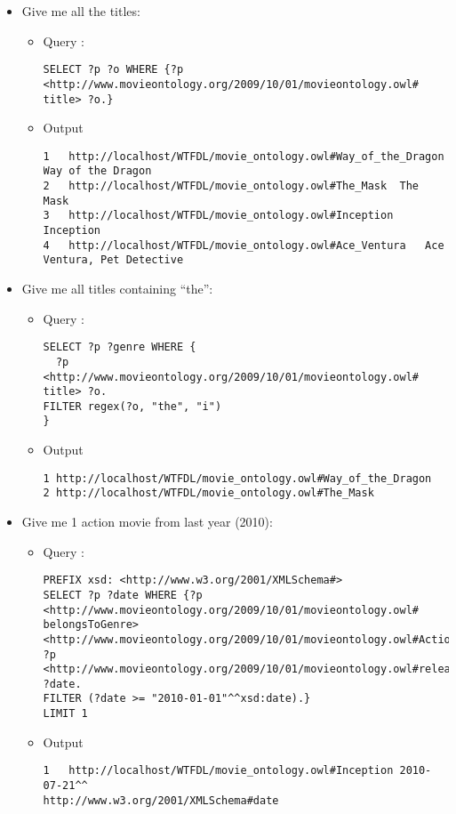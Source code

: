 \begin{itemize}

 \item Give me all the titles:
  \begin{itemize}
    \item Query : 
\begin{verbatim}
SELECT ?p ?o WHERE {?p <http://www.movieontology.org/2009/10/01/movieontology.owl#
title> ?o.}
\end{verbatim}
    \item Output
      \begin{verbatim}
1	http://localhost/WTFDL/movie_ontology.owl#Way_of_the_Dragon	Way of the Dragon	
2	http://localhost/WTFDL/movie_ontology.owl#The_Mask	The Mask	
3	http://localhost/WTFDL/movie_ontology.owl#Inception	Inception	
4	http://localhost/WTFDL/movie_ontology.owl#Ace_Ventura	Ace Ventura, Pet Detective	
      \end{verbatim}
    \end{itemize}

 \item Give me all titles containing ``the'':
  \begin{itemize}
    \item Query : 
\begin{verbatim}
SELECT ?p ?genre WHERE {
  ?p <http://www.movieontology.org/2009/10/01/movieontology.owl#
title> ?o.
FILTER regex(?o, "the", "i")
}
\end{verbatim}
    \item Output
      \begin{verbatim}
1 http://localhost/WTFDL/movie_ontology.owl#Way_of_the_Dragon 
2 http://localhost/WTFDL/movie_ontology.owl#The_Mask  
      \end{verbatim}
    \end{itemize}

 \item Give me 1 action movie from last year (2010):
  \begin{itemize}
    \item Query : 
\begin{verbatim}
PREFIX xsd: <http://www.w3.org/2001/XMLSchema#>
SELECT ?p ?date WHERE {?p <http://www.movieontology.org/2009/10/01/movieontology.owl#
belongsToGenre> <http://www.movieontology.org/2009/10/01/movieontology.owl#Action>.
?p <http://www.movieontology.org/2009/10/01/movieontology.owl#releasedate> ?date.
FILTER (?date >= "2010-01-01"^^xsd:date).}
LIMIT 1
\end{verbatim}
    \item Output
      \begin{verbatim}
1	http://localhost/WTFDL/movie_ontology.owl#Inception 2010-07-21^^
http://www.w3.org/2001/XMLSchema#date
      \end{verbatim}
    \end{itemize}


\end{itemize}
